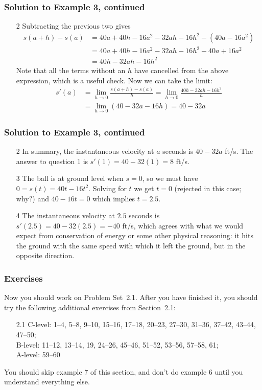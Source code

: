 \documentclass[serif,ignorenonframetext]{beamer}
\begin{document}
\begin{frame}
  \frametitle{Solution to Example 3, continued}
  \begin{enumerate}
  \item[2] Subtracting the previous two gives
    \begin{align*}
      s(a+h)-s(a) &= 40a+40h-16a^2-32ah-16h^2-(40a-16a^2) \\
                  &= 40a+40h-16a^2-32ah-16h^2-40a+16a^2 \\
		  &= 40h-32ah-16h^2
    \end{align*}
    Note that all the terms without an $h$ have cancelled from the
    above expression, which is a useful check.  Now we can take the limit:
    \begin{align*}
      s'(a) &= \lim_{h\to 0} \frac{s(a+h)-s(a)}{h}
      = \lim_{h\to 0} \frac{40h-32ah-16h^2}{h} \\
      &= \lim_{h\to 0} (40-32a-16h)
      = 40-32a
    \end{align*}
  \end{enumerate}
\end{frame}

\begin{frame}
  \frametitle{Solution to Example 3, continued}
  \begin{enumerate}
  \item[2] In summary, the instantaneous velocity at $a$ seconds is
    $40-32a$ ft/s.  The answer to question 1 is $s'(1)=40-32(1)=8$ ft/s.
  \item[3] The ball is at ground level when $s=0$, so we must have
    $0=s(t)=40t-16t^2$.  Solving for $t$ we get $t=0$ (rejected in this case;
    why?) and $40-16t=0$ which implies $t=2.5$.
  \item[4] The instantaneous velocity at $2.5$ seconds is
    $s'(2.5)=40-32(2.5)=-40$ ft/s, which agrees with what we would expect
    from conservation of energy or some other physical reasoning: it hits
    the ground with the same speed with which it left the ground, but in
    the opposite direction.
  \end{enumerate}
\end{frame}

\begin{frame}
  \frametitle{Exercises}
  Now you should work on Problem Set~2.1.  After you have finished it,
  you should try the following additional exercises from Section~2.1:
  \begin{itemize}
  \item[2.1] 
    C-level: 1--4, 5--8, 9--10, 15--16, 17--18, 20--23, 27--30, 31--36, 37--42,
    43--44, 47--50; \\
    B-level: 11--12, 13--14, 19, 24--26, 45--46, 51--52, 53--56, 57--58, 61; \\
    A-level: 59--60
  \end{itemize}
  You should skip example 7 of this section, and don't do example 6 
  until you understand everything else.
\end{frame}
\end{document}
